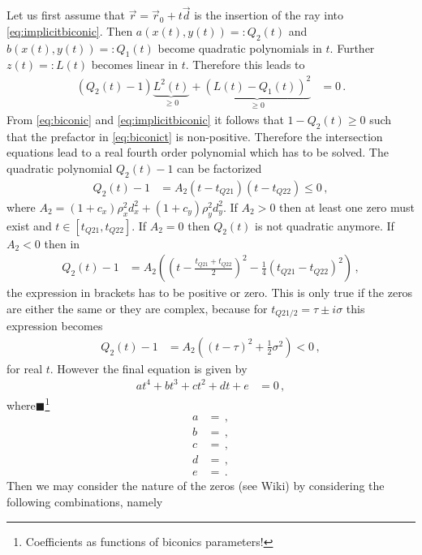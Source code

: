 \documentclass[12pt,a4paper,twoside,openright,BCOR10mm,headsepline,titlepage,abstracton,chapterprefix,final]{scrreprt}
\newcommand{\remark}[1]{{\color{red}$\blacksquare$}\footnote{{\color{red}#1}}}
\begin{document}
Let us first assume that $\vec{r} = \vec{r}_0 + t \vec{d}$ is the insertion of the ray into
\eqref{eq:implicitbiconic}. Then $a(x(t), y(t)) =: Q_2(t)$ and $b(x(t), y(t)) =: Q_1(t)$ become quadratic polynomials 
in $t$. Further $z(t) =: L(t)$ becomes linear in $t$. Therefore this leads to
\begin{align}
 (Q_2(t) - 1) \underbrace{L^2(t)}_{\ge0} + \underbrace{(L(t) - Q_1(t))^2}_{\ge0} &= 0\,.\label{eq:biconict}
\end{align}
From \eqref{eq:biconic} and \eqref{eq:implicitbiconic} it follows that $1 - Q_2(t) \ge 0$ such that the
prefactor in \eqref{eq:biconict} is non-positive. Therefore the intersection equations lead to a real
fourth order polynomial which has to be solved. The quadratic polynomial $Q_2(t) - 1$ can be factorized
\begin{align}
 Q_2(t) - 1 &= A_2 (t - t_{Q21})(t - t_{Q22}) \le 0\,,
\end{align}
where $A_2 = (1 + c_x) \rho_x^2 d_x^2 + (1 + c_y) \rho_y^2 d_y^2$. If $A_2 > 0$ then at least one zero must exist and
$t \in [t_{Q21}, t_{Q22}]$. If $A_2 = 0$ then $Q_2(t)$ is not quadratic anymore. If $A_2 < 0$ then in 
\begin{align}
 Q_2(t) - 1 &= A_2 \left(\left(t-\frac{t_{Q21} + t_{Q22}}{2}\right)^2 - \frac{1}{4}(t_{Q21} - t_{Q22})^2\right)\,,
\end{align}
the expression in brackets has to be positive or zero. This is only true if the zeros are either the same or they are complex, because
for $t_{Q21/2} = \tau \pm i \sigma$ this expression becomes
\begin{align}
 Q_2(t) - 1 &= A_2 \left(\left(t-\tau\right)^2 + \frac{1}{2}\sigma^2\right)<0\,,
\end{align}
for real $t$. However the final equation is given by
\begin{align}
 a t^4 + b t^3 + c t^2 + d t + e &= 0\,,
\end{align}
where\remark{Coefficients as functions of biconics parameters!}
\begin{subequations}
 \begin{align}
  a &= \,,\\
  b &= \,,\\
  c &= \,,\\
  d &= \,,\\
  e &= \,.
 \end{align}
\end{subequations}
Then we may consider the nature of the zeros (see Wiki) by considering the following combinations, namely
\end{document}
